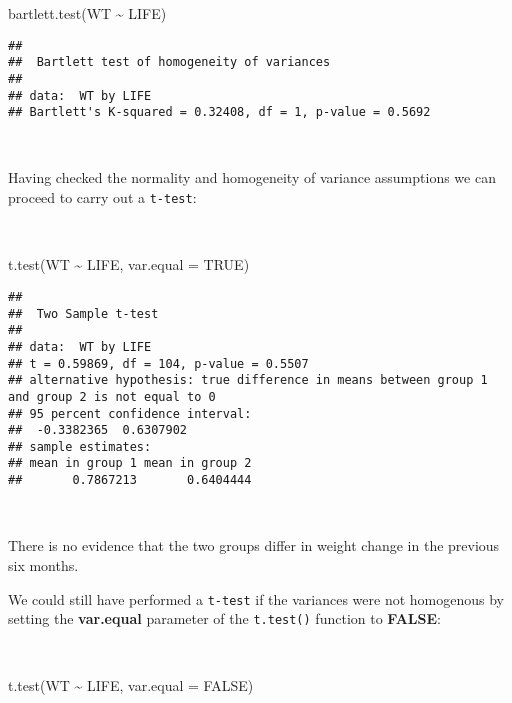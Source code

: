 \documentclass[
  12pt,
  a4paper]{book}
\newenvironment{Shaded}{\begin{snugshade}}{\end{snugshade}}
\newcommand{\AttributeTok}[1]{\textcolor[rgb]{0.77,0.63,0.00}{#1}}
\newcommand{\ConstantTok}[1]{\textcolor[rgb]{0.00,0.00,0.00}{#1}}
\newcommand{\FunctionTok}[1]{\textcolor[rgb]{0.00,0.00,0.00}{#1}}
\newcommand{\NormalTok}[1]{#1}
\newcommand{\SpecialCharTok}[1]{\textcolor[rgb]{0.00,0.00,0.00}{#1}}
\begin{document}
\begin{Shaded}
\begin{Highlighting}[]
\FunctionTok{bartlett.test}\NormalTok{(WT }\SpecialCharTok{\textasciitilde{}}\NormalTok{ LIFE)}
\end{Highlighting}
\end{Shaded}

\begin{verbatim}
## 
##  Bartlett test of homogeneity of variances
## 
## data:  WT by LIFE
## Bartlett's K-squared = 0.32408, df = 1, p-value = 0.5692
\end{verbatim}

~

Having checked the normality and homogeneity of variance assumptions we can proceed to carry out a \texttt{t-test}:

~

\begin{Shaded}
\begin{Highlighting}[]
\FunctionTok{t.test}\NormalTok{(WT }\SpecialCharTok{\textasciitilde{}}\NormalTok{ LIFE, }\AttributeTok{var.equal =} \ConstantTok{TRUE}\NormalTok{)}
\end{Highlighting}
\end{Shaded}

\begin{verbatim}
## 
##  Two Sample t-test
## 
## data:  WT by LIFE
## t = 0.59869, df = 104, p-value = 0.5507
## alternative hypothesis: true difference in means between group 1 and group 2 is not equal to 0
## 95 percent confidence interval:
##  -0.3382365  0.6307902
## sample estimates:
## mean in group 1 mean in group 2 
##       0.7867213       0.6404444
\end{verbatim}

~

There is no evidence that the two groups differ in weight change in the previous six months.

We could still have performed a \texttt{t-test} if the variances were not homogenous by setting the \textbf{var.equal} parameter of the \texttt{t.test()} function to \textbf{FALSE}:

~

\begin{Shaded}
\begin{Highlighting}[]
\FunctionTok{t.test}\NormalTok{(WT }\SpecialCharTok{\textasciitilde{}}\NormalTok{ LIFE, }\AttributeTok{var.equal =} \ConstantTok{FALSE}\NormalTok{)}
\end{Highlighting}
\end{Shaded}
\end{document}
